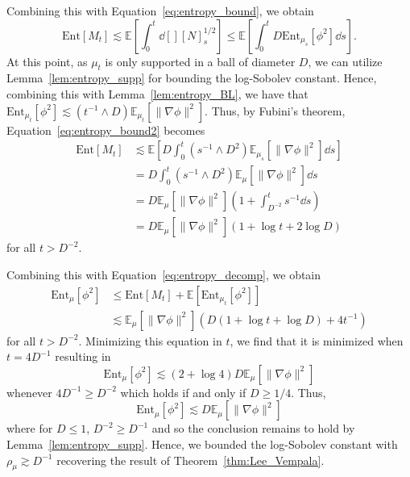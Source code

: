 Combining this with Equation~\eqref{eq:entropy_bound}, we obtain
\begin{equation}\label{eq:entropy_bound2}
  \text{Ent}[M_t] \lesssim \mathbb{E}\left[\int_0^t \dd[] [N]_s^{1 / 2}\right]
    \le \mathbb{E}\left[\int_0^t D \text{Ent}_{\mu_s}[\phi^2] \dd s\right].
\end{equation}
At this point, as \(\mu_t\) is only supported in a ball of diameter \(D\), 
we can utilize Lemma~\ref{lem:entropy_supp} for bounding the log-Sobolev constant.
Hence, combining this with Lemma~\ref{lem:entropy_BL}, we have that 
\(\text{Ent}_{\mu_t}[\phi^2] \lesssim (t^{-1} \wedge D) \mathbb{E}_{\mu_t}[\|\nabla \phi\|^2]\). Thus, 
by Fubini's theorem, Equation~\eqref{eq:entropy_bound2} becomes
\begin{align*}
  \text{Ent}[M_t] & \lesssim \mathbb{E}\left[D \int_0^t (s^{-1} \wedge D^2)\mathbb{E}_{\mu_s}[\|\nabla \phi\|^2] \dd s\right]\\
    & = D \int_0^t (s^{-1} \wedge D^2)\mathbb{E}_\mu[\|\nabla \phi\|^2] \dd s\\
    & = D \mathbb{E}_\mu[\|\nabla \phi\|^2] \left(1 + \int_{D^{-2}}^t s^{-1}\dd s\right)\\
    & = D \mathbb{E}_\mu[\|\nabla \phi\|^2] (1 + \log t + 2\log D)
\end{align*}
for all \(t > D^{-2}\).

Combining this with Equation~\eqref{eq:entropy_decomp}, we obtain
\begin{align*}
  \text{Ent}_\mu[\phi^2] & \le \text{Ent}[M_t] + \mathbb{E}[\text{Ent}_{\mu_t}[\phi^2]]\\
  & \lesssim \mathbb{E}_\mu[\|\nabla \phi\|^2](D (1 + \log t + \log D) + 4t^{-1})
\end{align*}
for all \(t > D^{-2}\). Minimizing this equation in \(t\), we find that it is minimized when \(t = 4D^{-1}\) resulting in 
\[\text{Ent}_\mu[\phi^2] \lesssim (2 + \log 4)D\mathbb{E}_\mu[\|\nabla \phi\|^2]\]
whenever \(4D^{-1} \ge D^{-2}\) which holds if and only if \(D \ge 1 / 4\). Thus, 
\[\text{Ent}_\mu[\phi^2] \lesssim D \mathbb{E}_\mu[\|\nabla \phi\|^2]\]
where for \(D \le 1\), \(D^{-2} \ge D^{-1}\) and so the conclusion remains to hold by Lemma~\ref{lem:entropy_supp}. 
Hence, we bounded the log-Sobolev constant with \(\rho_{\mu} \gtrsim D^{-1}\) recovering the result of Theorem~\ref{thm:Lee_Vempala}.

